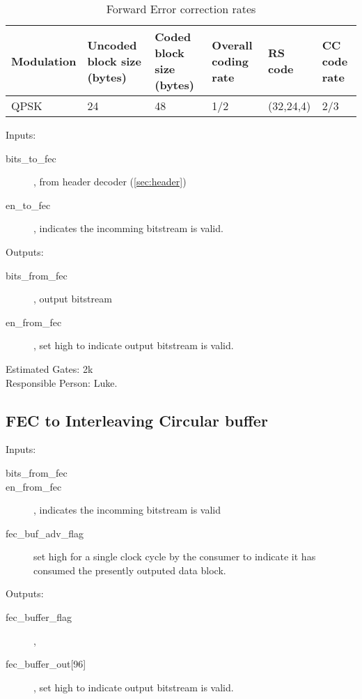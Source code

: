 \documentclass[10pt,twocolumn]{article}
\begin{document}
		\begin{table*}
			\begin{tabular}{p{2cm}|p{2cm}|p{2cm}|p{2cm}|p{2cm}|p{2cm}}
			\label{tbl:fec}
				Modulation & Uncoded block size (bytes) &
				Coded block size (bytes) & Overall coding
				rate & RS code & CC code rate \\ \hline
				QPSK & 24 & 48 & 1/2 & (32,24,4) & 2/3 \\
			\end{tabular}
			\caption{Forward Error correction rates}
		\end{table*}

		\begin{description}
			\item{Inputs:} \begin{description}
				\item[bits\_to\_fec], from header decoder
					(\autoref{sec:header})
				\item[en\_to\_fec], indicates the incomming
					bitstream is valid.
			\end{description}
			\item{Outputs:} \begin{description}
				\item[bits\_from\_fec], output bitstream
				\item[en\_from\_fec], set high to indicate
					output bitstream is valid.
			\end{description}
		\end{description}

		Estimated Gates: 2k \\
		Responsible Person: Luke.

	\subsection{FEC to Interleaving Circular buffer}
		\label{sec:fec_buffer}

		\begin{description}
			\item{Inputs:} \begin{description}
				\item[bits\_from\_fec]
				\item[en\_from\_fec], indicates the incomming
					bitstream is valid
				\item[fec\_buf\_adv\_flag] set high for a
					single clock cycle by the consumer to
					indicate it has consumed the
					presently outputed data block.
			\end{description}
			\item{Outputs:} \begin{description}
				\item[fec\_buffer\_flag], 
				\item[fec\_buffer\_out{[96]}], set high to indicate
					output bitstream is valid.
			\end{description}
		\end{description}
\end{document}

